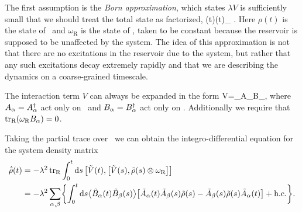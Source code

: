 The first assumption is the \emph{Born approximation}, which states $\lambda V$ is sufficiently small that we should treat the total state as factorized,
\be
    \label{eq:bornaprx}
    \sigma(t)\simeq\rho(t)\otimes\omega_ .
\ee%
Here $\rho(t)$ is the state of \SSS\ and $\omega_\text{R}$ is the state of \RRR, taken to be constant because the reservoir is supposed to be unaffected by the system. The idea of this approximation is not that there are no excitations in the reservoir due to the system, but rather that any such excitations decay extremely rapidly and that we are describing the dynamics on a coarse-grained timescale.

The interaction term $V$ can always be expanded in the form
\be
    V=\sum_\alpha A_\alpha \otimes B_\alpha ,
\ee
where $A_\alpha=A^{\dag}_\alpha$ act only on \SSS\ and $B_\alpha=B^{\dag}_\alpha$ act only on \RRR\@. Additionally we require that $\operatorname{tr}_\text{R}(\omega_\text{R} B_\alpha)=0$.

Taking the partial trace over \RRR\ we can obtain the integro-differential equation for the system density matrix
\begin{align}\label{eq:int2}
    \dot{\tilde{\rho}}(t)&=-\lambda^2 \operatorname{tr}_\text{R}
        \int_0^t\mathrm{d} s\left[\tilde{V}(t),\left[\tilde{V}(s),\tilde\rho(s)\otimes\omega_\text{R}\right]\right] \\
    &=-\lambda^2 \sum_{\alpha,\beta}\biggl\{
        \int_0^t\mathrm{d} s \bigl\langle\tilde{B}_\alpha(t)\tilde{B}_\beta(s)\bigr\rangle
\bigl[\tilde{A}_\alpha(t)\tilde{A}_\beta(s)\tilde{\rho}(s)-\tilde{A}_\beta(s)\tilde{\rho}(s)\tilde{A}_\alpha(t)\bigr]
        +\text{h.c.}\biggr\} . \nonumber
\end{align}

